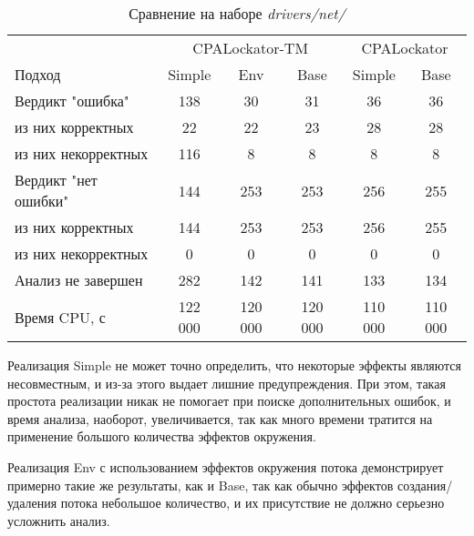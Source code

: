 \begin{center}
  \begin{table}[h]\footnotesize \centering
  	\label{table-drivers-thread}
    \caption{Сравнение  на наборе \textit{drivers/net/}}
    \begin{tabular}{ | l | c | c | c | c | c |}
      \hline
      					& \multicolumn{3}{|c|}{CPALockator-TM} 			& \multicolumn{2}{|c|}{CPALockator} 	\\
      Подход         				& Simple 	& Env 		& Base 		& Simple 	& Base  	\\ \hline
      Вердикт "ошибка" 				& 138    	& 30   		& 31   		& 36        & 36  	 	\\ 
  \hspace{0.5cm} из них корректных 	& 22 		& 22 		& 23   		& 28       	& 28   		\\ 
  \hspace{0.5cm} из них некорректных & 116 		& 8 		& 8   		& 8       	& 8     	\\ \hline
      Вердикт "нет ошибки"  		& 144      	& 253    	& 253    	& 256      	& 255     	\\ 
  \hspace{0.5cm} из них корректных 	& 144 		& 253    	& 253    	& 256       & 255   	\\
  \hspace{0.5cm} из них некорректных & 0 		& 0    		& 0     	& 0         & 0   		\\ \hline
      Анализ не завершен       		& 282     	& 142    	& 141    	& 133      	& 134   	\\ \hline
      Время CPU, с   				& 122 000 	& 120 000 	& 120 000 	& 110 000  	& 110 000   \\ 
      \hline
    \end{tabular}
  \end{table}
\end{center}

Реализация Simple не может точно определить, что некоторые эффекты являются несовместным, и из-за этого выдает лишние предупреждения.
При этом, такая простота реализации никак не помогает при поиске дополнительных ошибок, и время анализа, наоборот, увеличивается, так как много времени тратится на применение большого количества эффектов окружения.

Реализация Env с использованием эффектов окружения потока демонстрирует примерно такие же результаты, как и Base, так как обычно эффектов создания/удаления потока небольшое количество, и их присутствие не должно серьезно усложнить анализ.

